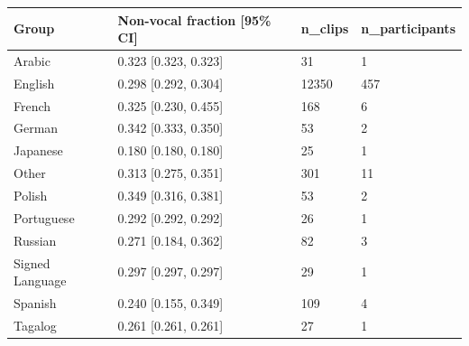 \begin{tabular}{llll}
\toprule
Group & Non-vocal fraction [95\% CI] & n\_clips & n\_participants \\
\midrule
Arabic & 0.323 [0.323, 0.323] & 31 & 1 \\
English & 0.298 [0.292, 0.304] & 12350 & 457 \\
French & 0.325 [0.230, 0.455] & 168 & 6 \\
German & 0.342 [0.333, 0.350] & 53 & 2 \\
Japanese & 0.180 [0.180, 0.180] & 25 & 1 \\
Other & 0.313 [0.275, 0.351] & 301 & 11 \\
Polish & 0.349 [0.316, 0.381] & 53 & 2 \\
Portuguese & 0.292 [0.292, 0.292] & 26 & 1 \\
Russian & 0.271 [0.184, 0.362] & 82 & 3 \\
Signed Language & 0.297 [0.297, 0.297] & 29 & 1 \\
Spanish & 0.240 [0.155, 0.349] & 109 & 4 \\
Tagalog & 0.261 [0.261, 0.261] & 27 & 1 \\
\bottomrule
\end{tabular}
